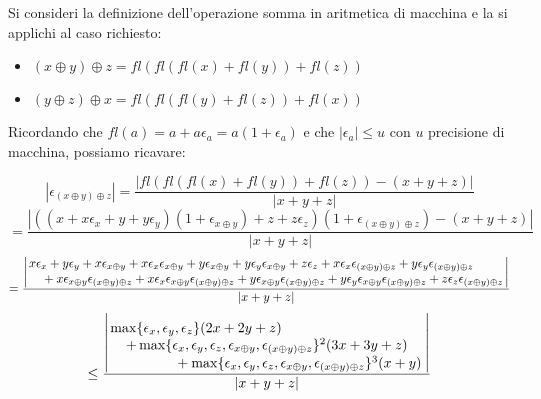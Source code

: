 \begin{center}
\footnotesize\noindent{}\end{center}

\noindent Si consideri la definizione dell'operazione somma in aritmetica di macchina e la si applichi al caso richiesto:

\begin{itemize}

\item \((x \oplus y) \oplus z = fl( fl( fl(x) + fl(y) ) + fl(z)) \)
\item \((y \oplus z) \oplus x = fl( fl( fl(y) + fl(z) ) + fl(x)) \)

\end{itemize}

\noindent Ricordando che \(fl(a) = a + a\epsilon_a = a (1 + \epsilon_a)\) e che \(|\epsilon_a| \leq u\) con \(u\) precisione di macchina, possiamo ricavare:

\[
|\epsilon_{(x \oplus y) \oplus z }| = \frac{|fl( fl( fl(x) + fl(y) ) + fl(z)) - (x + y + z)|}{|x+y+z|}
\]
\[=
\frac{|((x + x\epsilon_x + y + y\epsilon_y)(1+\epsilon_{x \oplus y}) + z + z\epsilon_z)(1 +\epsilon_{(x \oplus y) \oplus z }) - (x+y+z)|}{|x+y+z|}
\]
\[
=\frac{\left|\splitfrac{x\epsilon_x + y\epsilon_y + x\epsilon_{x \oplus y} + x\epsilon_x\epsilon_{x \oplus y} + y\epsilon_{x \oplus y} + y\epsilon_y\epsilon_{x \oplus y} + z\epsilon_z + x\epsilon_x\epsilon_{(x \oplus y) \oplus z} + y\epsilon_y\epsilon_{(x \oplus y) \oplus z}    }{     + x\epsilon_{x \oplus y}\epsilon_{(x \oplus y) \oplus z} + x\epsilon_x\epsilon_{x \oplus y}\epsilon_{(x \oplus y) \oplus z} + y\epsilon_{x \oplus y}\epsilon_{(x \oplus y) \oplus z} + y\epsilon_y\epsilon_{x \oplus y}\epsilon_{(x \oplus y) \oplus z} + z\epsilon_z\epsilon_{(x \oplus y) \oplus z}}\right|}{|x+y+z|}
\]
\[
\leq \frac{\left|\splitfrac{\max \{\epsilon_x, \epsilon_y, \epsilon_z\}(2x+2y+z) }{  \splitfrac{+ \max \{\epsilon_x, \epsilon_y, \epsilon_z, \epsilon_{x \oplus y}, \epsilon_{(x \oplus y) \oplus z}\} ^2 (3x+3y+z) }{+  \max \{\epsilon_x, \epsilon_y, \epsilon_z, \epsilon_{x \oplus y}, \epsilon_{(x \oplus y) \oplus z}\} ^3 (x+y)}}\right|}{|x+y+z|}
\]

